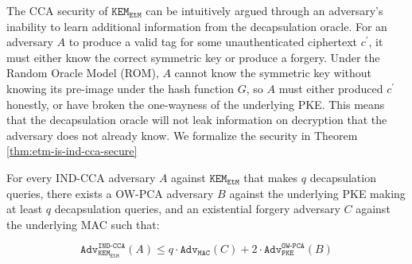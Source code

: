 \documentclass[runningheads]{llncs}
\newcommand{\pke}{\texttt{PKE}}
\newcommand{\kem}{\texttt{KEM}}
\newcommand{\etm}{\texttt{EtM}}  %
\newcommand{\mac}{\texttt{MAC}}
\begin{document}
The CCA security of $\kem_\etm$ can be intuitively argued through an adversary's inability to learn additional information from the decapsulation oracle. For an adversary $A$ to produce a valid tag for some unauthenticated ciphertext $c^\prime$, it must either know the correct symmetric key or produce a forgery. Under the Random Oracle Model (ROM), $A$ cannot know the symmetric key without knowing its pre-image under the hash function $G$, so $A$ must either produced $c^\prime$ honestly, or have broken the one-wayness of the underlying PKE. This means that the decapsulation oracle will not leak information on decryption that the adversary does not already know. We formalize the security in Theorem \ref{thm:etm-is-ind-cca-secure}

\begin{theorem}\label{thm:etm-is-ind-cca-secure}
    For every IND-CCA adversary $A$ against $\kem_\etm$ that makes $q$ decapsulation queries, there exists a OW-PCA adversary $B$ against the underlying PKE making at least $q$ decapsulation queries, and an existential forgery adversary $C$ against the underlying MAC such that:

    \begin{equation*}
        \texttt{Adv}^\texttt{IND-CCA}_{\kem_\etm}(A) \leq q \cdot \texttt{Adv}_{\mac}(C) + 2 \cdot \texttt{Adv}^\texttt{OW-PCA}_{\pke}(B)
    \end{equation*}
\end{theorem}
\end{document}
